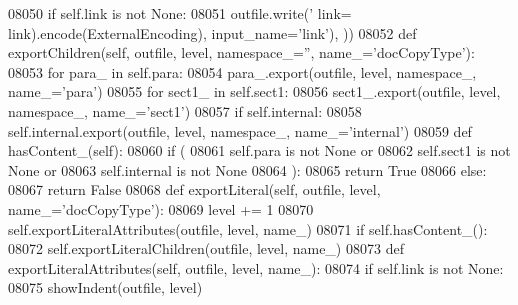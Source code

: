 \begin{DoxyCode}
{{{{{{{{{{{{{{{{{{{{{{{{{{{{{{{{{{{{{{{{{{{{{{{{{{{{{{{{{{{{{{{{{{{{{{{{{{{{{{{{{{{{{{{{{{{{{{{{{{{{{{{{{{{{{{{{{{{{{{{{{{{{{{{{{{{{{{{{{{{{{{{{{{{{{{{{{{{{{{{{{{{{{{{{{{{{{{{{{{{{{{{{{{{{{{{{{{{{{{{{{{{{{{{{{{{{{{{{{{{{{{{{{{{{{{{{{{{{{{{{{{{{{{{{{{{{{{{{{{{{{{{{{{{{{{{{{{{{{{{{{{{{{{{{{{{{{{{{{{{{{{{{{{{{{{{{{{{{{{{{{{{{{{{{{{{{{{{{{{{{{{{{{{{{{{{{{{{{{{{{{{{{{{{{{{{{{{{{{{{{{{{{{{{{{{{{{{{{{{{{{{{{{{{{{{{{{{{{{{{{{{{{{{{{{{{{{{{{{{{{{{{{{{{{{{{{{{{{{{{{{{{{{{{{{{{{{{{{{{{{{{{{{{{{{{{{{{08050         \textcolor{keywordflow}{if} self.link \textcolor{keywordflow}{is} \textcolor{keywordflow}{not} \textcolor{keywordtype}{None}:
08051             outfile.write(\textcolor{stringliteral}{' link=%
      link).encode(ExternalEncoding), input\_name=\textcolor{stringliteral}{'link'}), ))
08052     \textcolor{keyword}{def }exportChildren(self, outfile, level, namespace\_='', name\_='docCopyType'):
08053         \textcolor{keywordflow}{for} para\_ \textcolor{keywordflow}{in} self.para:
08054             para\_.export(outfile, level, namespace\_, name\_=\textcolor{stringliteral}{'para'})
08055         \textcolor{keywordflow}{for} sect1\_ \textcolor{keywordflow}{in} self.sect1:
08056             sect1\_.export(outfile, level, namespace\_, name\_=\textcolor{stringliteral}{'sect1'})
08057         \textcolor{keywordflow}{if} self.internal:
08058             self.internal.export(outfile, level, namespace\_, name\_=\textcolor{stringliteral}{'internal'})
08059     \textcolor{keyword}{def }hasContent_(self):
08060         \textcolor{keywordflow}{if} (
08061             self.para \textcolor{keywordflow}{is} \textcolor{keywordflow}{not} \textcolor{keywordtype}{None} \textcolor{keywordflow}{or}
08062             self.sect1 \textcolor{keywordflow}{is} \textcolor{keywordflow}{not} \textcolor{keywordtype}{None} \textcolor{keywordflow}{or}
08063             self.internal \textcolor{keywordflow}{is} \textcolor{keywordflow}{not} \textcolor{keywordtype}{None}
08064             ):
08065             \textcolor{keywordflow}{return} \textcolor{keyword}{True}
08066         \textcolor{keywordflow}{else}:
08067             \textcolor{keywordflow}{return} \textcolor{keyword}{False}
08068     \textcolor{keyword}{def }exportLiteral(self, outfile, level, name\_='docCopyType'):
08069         level += 1
08070         self.exportLiteralAttributes(outfile, level, name\_)
08071         \textcolor{keywordflow}{if} self.hasContent_():
08072             self.exportLiteralChildren(outfile, level, name\_)
08073     \textcolor{keyword}{def }exportLiteralAttributes(self, outfile, level, name\_):
08074         \textcolor{keywordflow}{if} self.link \textcolor{keywordflow}{is} \textcolor{keywordflow}{not} \textcolor{keywordtype}{None}:
08075             showIndent(outfile, level)
}}}}}}}}}}}}}}}}}}}}}}}}}}}}}}}}}}}}}}}}}}}}}}}}}}}}}}}}}}}}}}}}}}}}}}}}}}}}}}}}}}}}}}}}}}}}}}}}}}}}}}}}}}}}}}}}}}}}}}}}}}}}}}}}}}}}}}}}}}}}}}}}}}}}}}}}}}}}}}}}}}}}}}}}}}}}}}}}}}}}}}}}}}}}}}}}}}}}}}}}}}}}}}}}}}}}}}}}}}}}}}}}}}}}}}}}}}}}}}}}}}}}}}}}}}}}}}}}}}}}}}}}}}}}}}}}}}}}}}}}}}}}}}}}}}}}}}}}}}}}}}}}}}}}}}}}}}}}}}}}}}}}}}}}}}}}}}}}}}}}}}}}}}}}}}}}}}}}}}}}}}}}}}}}}}}}}}}}}}}}}}}}}}}}}}}}}}}}}}}}}}}}}}}}}}}}}}}}}}}}}}}}}}}}}}}}}}}}}}}}}}}}}}}}}}}}}}}}}}}}}}}}}}}}}}}}}}}}}}}}}}}}}}}}}}}}}}}
\end{DoxyCode}
